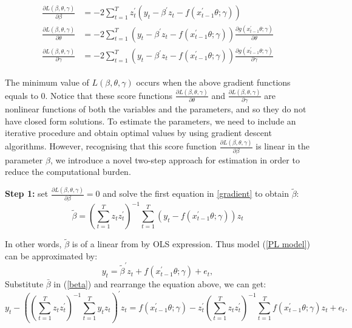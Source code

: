 \documentclass[a4paper,12pt,times,numbered,print,index]{report}
\numberwithin{equation}{section}
\begin{document}
\begin{align}
	\begin{split}
	\frac{\partial L(\beta, \theta, \gamma)}{\partial \beta} &= -2\sum_{t=1}^{T} z_t^{\prime} \left( y_t - \beta^{\prime} z_t - f\left( x_{t-1}^{\prime }\theta; \gamma\right)\right) \\
	\frac{\partial L(\beta, \theta, \gamma)}{\partial \theta} &= -2\sum_{t=1}^{T} \left( y_t - \beta^{\prime} z_t - f\left( x_{t-1}^{\prime }\theta; \gamma\right)\right)\frac{\partial g(x_{t-1}^{\prime }\theta; \gamma)}{\partial \theta} \\
	\frac{\partial L(\beta, \theta, \gamma)}{\partial \gamma} &= -2\sum_{t=1}^{T} \left( y_t - \beta^{\prime} z_t - f\left( x_{t-1}^{\prime }\theta; \gamma\right)\right) \frac{\partial g(x_{t-1}^{\prime }\theta; \gamma)}{\partial \gamma}
	\end{split}
	\label{gradient}
\end{align}


The minimum value of $L(\beta, \theta, \gamma)$ occurs when the above gradient functions equals to 0. Notice that these score functions $\frac{\partial L(\beta, \theta, \gamma)}{\partial \theta}$ and $\frac{\partial L(\beta, \theta, \gamma)}{\partial \gamma}$ are nonlinear functions of both the variables and the parameters, and so they do not have closed form solutions. To estimate the parameters, we need to include an iterative procedure and obtain optimal values by using gradient descent algorithms. However, recognising that this score function $\frac{\partial L(\beta, \theta, \gamma)}{\partial \beta}$ is linear in the parameter $\beta$, we introduce a novel two-step approach for estimation in order to reduce the computational burden. 

\textbf{Step 1:} set $\frac{\partial L(\beta, \theta, \gamma)}{\partial \beta} = 0$ and solve the first equation in \ref{gradient} to obtain $\tilde{\beta}$:
\begin{equation}
\tilde{\beta} = \left( \sum_{t=1}^{T}z_t z_t^{\prime}\right)^{-1}\sum_{t=1}^{T}\left( y_t - f\left( x_{t-1}^{\prime }\theta; \gamma\right)\right) z_t
\label{beta}
\end{equation}

In other words, $\tilde{\beta}$ is of a linear from by OLS expression. Thus model (\ref{PL model}) can be approximated by:
$$
y_t = \tilde{\beta}^{\prime} z_t + f\left( x_{t-1}^{\prime }\theta; \gamma\right) +e_{t},
$$
Substitute $\bar{\beta}$ in (\ref{beta}) and rearrange the equation above, we can get:
$$
y_t - \left( \left( \sum_{t=1}^{T}z_t z_t^{\prime}\right)^{-1} \sum_{t=1}^{T}y_t z_t \right) ^{\prime} z_t = f\left( x_{t-1}^{\prime }\theta; \gamma\right) - z_t^{\prime} \left( \sum_{t=1}^{T}z_t z_t^{\prime}\right)^{-1} \sum_{t=1}^{T} f\left( x_{t-1}^{\prime }\theta; \gamma\right) z_t + e_t.
$$
\end{document}

